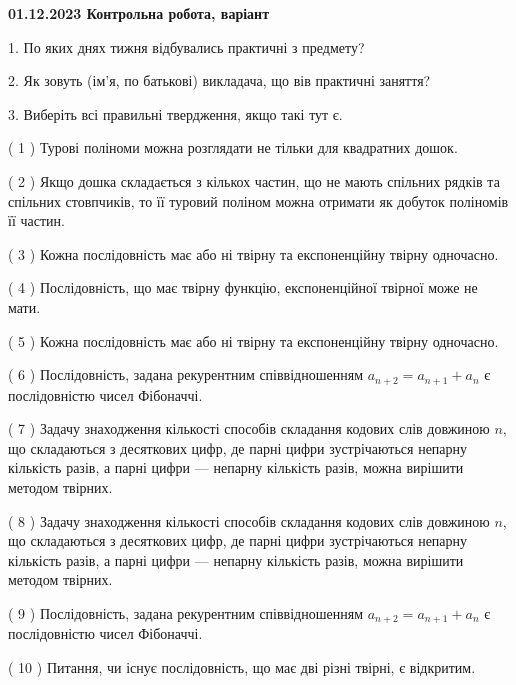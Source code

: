 \documentclass[12pt, ukrainian]{article}
\begin{document}
\vspace{4mm}
\newpage
\begin {large}

\textbf{01.12.2023 Контрольна робота, варіант  }\par


{
1. По яких днях тижня відбувались практичні з предмету?



\vspace{5mm}
2. Як зовуть (ім'я, по батькові) викладача, що вів практичні заняття?



\vspace{5mm}
3. Виберіть всі правильні твердження, якщо такі тут є.\par
\vspace{2mm}
( 1 ) Турові поліноми можна розглядати не тільки для квадратних дошок.%

( 2 ) Якщо дошка складається з кількох частин, що не мають спільних рядків та спільних стовпчиків, то її туровий поліном можна отримати як добуток поліномів її частин.%

( 3 ) Кожна послідовність має або ні твірну та експоненційну твірну одночасно.%

( 4 ) Послідовність, що має твірну функцію, експоненційної твірної може не мати.%

( 5 ) Кожна послідовність має або ні твірну та експоненційну твірну одночасно.%

( 6 ) Послідовність, задана рекурентним співвідношенням $a_{n+2}=a_{n+1}+a_{n}$ є послідовністю чисел Фібоначчі.%

( 7 ) Задачу знаходження кількості способів складання кодових слів довжиною $n$, що складаються з десяткових цифр, де парні цифри зустрічаються непарну кількість разів, а парні цифри — непарну кількість разів, можна вирішити методом твірних.%

( 8 ) Задачу знаходження кількості способів складання кодових слів довжиною $n$, що складаються з десяткових цифр, де парні цифри зустрічаються непарну кількість разів, а парні цифри — непарну кількість разів, можна вирішити методом твірних.%

( 9 ) Послідовність, задана рекурентним співвідношенням $a_{n+2}=a_{n+1}+a_{n}$ є послідовністю чисел Фібоначчі.%

( 10 ) Питання, чи існує послідовність, що має дві різні твірні, є відкритим.%
}
\end {large}
\end{document}
